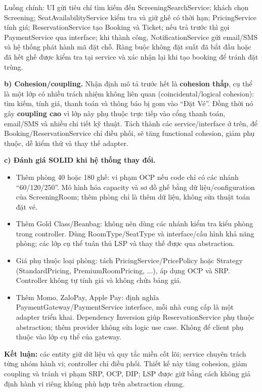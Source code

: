 \documentclass[11pt,a4paper]{article}
\begin{document}
Luồng chính: UI gửi tiêu chí tìm kiếm đến ScreeningSearchService; khách chọn Screening; SeatAvailabilityService kiểm tra và giữ ghế có thời hạn; PricingService tính giá; ReservationService tạo Booking và Ticket; nếu trả trước thì gọi PaymentService qua interface; khi thành công, NotificationService gửi email/SMS và hệ thống phát hành mã đặt chỗ. Ràng buộc không đặt suất đã bắt đầu hoặc đã hết ghế được kiểm tra tại service và xác nhận lại khi tạo booking để tránh đặt trùng.

\textbf{b) Cohesion/coupling.} Nhận định mô tả trước hết là \textbf{cohesion thấp}, cụ thể là một lớp có nhiều trách nhiệm không liên quan (coincidental/logical cohesion): tìm kiếm, tính giá, thanh toán và thông báo bị gom vào ``Đặt Vé''. Đồng thời nó gây \textbf{coupling cao} vì lớp này phụ thuộc trực tiếp vào cổng thanh toán, email/SMS và nhiều chi tiết kỹ thuật. Tách thành các service/interface ở trên, để Booking/ReservationService chỉ điều phối, sẽ tăng functional cohesion, giảm phụ thuộc, dễ kiểm thử và thay thế adapter.

\textbf{c) Đánh giá SOLID khi hệ thống thay đổi.}
\begin{itemize}[leftmargin=1.05cm,itemsep=1pt]
  \item Thêm phòng 40 hoặc 180 ghế: vi phạm OCP nếu code chỉ có các nhánh ``60/120/250''. Mô hình hóa capacity và sơ đồ ghế bằng dữ liệu/configuration của ScreeningRoom; thêm phòng chỉ là thêm dữ liệu, không sửa thuật toán đặt vé.
  \item Thêm Gold Class/Beanbag: không nên dùng các nhánh kiểm tra kiểu phòng trong controller. Dùng RoomType/SeatType và interface/cấu hình khả năng phòng; các lớp cụ thể tuân thủ LSP và thay thế được qua abstraction.
  \item Giá phụ thuộc loại phòng: tách PricingService/PricePolicy hoặc Strategy (StandardPricing, PremiumRoomPricing, ...), áp dụng OCP và SRP. Controller không tự tính giá và không chứa bảng giá.
  \item Thêm Momo, ZaloPay, Apple Pay: định nghĩa PaymentGateway/PaymentService interface, mỗi nhà cung cấp là một adapter triển khai. Dependency Inversion giúp ReservationService phụ thuộc abstraction; thêm provider không sửa logic use case. Không để client phụ thuộc vào lớp cụ thể của gateway.
\end{itemize}

\textbf{Kết luận:} các entity giữ dữ liệu và quy tắc miền cốt lõi; service chuyên trách từng nhóm hành vi; controller chỉ điều phối. Thiết kế này tăng cohesion, giảm coupling và tránh vi phạm SRP, OCP, DIP; LSP được giữ bằng cách không giả định hành vi riêng không phù hợp trên abstraction chung.
\end{document}
